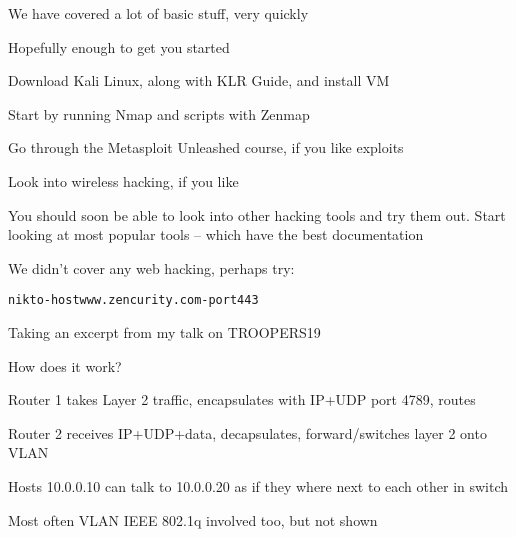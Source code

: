 \documentclass[Screen16to9,17pt]{foils}
\begin{document}


\centerline{}




\begin{quote}

\end{quote}

\begin{list1}
\item We have covered a lot of basic stuff, very quickly
\item Hopefully enough to get you started
\begin{list2}
\item Download Kali Linux, along with KLR Guide, and install VM
\item Start by running Nmap and scripts with Zenmap
\item Go through the Metasploit Unleashed course, if you like exploits
\item Look into wireless hacking, if you like
\item You should soon be able to look into other hacking tools and try them out. Start looking at most popular tools -- which have the best documentation
\end{list2}
\end{list1}

We didn't cover any web hacking, perhaps try:
\begin{alltt}
  nikto -host www.zencurity.com -port 443
\end{alltt}





Taking an excerpt from my talk on TROOPERS19\\
{\footnotesize{}}



How does it work?

\begin{list2}
\item Router 1 takes Layer 2 traffic, encapsulates with IP+UDP port 4789, routes
\item Router 2 receives IP+UDP+data, decapsulates, forward/switches layer 2 onto VLAN
\item Hosts 10.0.0.10 can talk to 10.0.0.20 as if they where next to each other in switch
\item Most often VLAN IEEE 802.1q involved too, but not shown
\end{list2}
\end{document}
